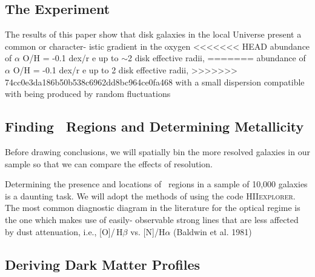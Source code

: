 \documentclass[11pt, a4paper, onecolumn]{article}
\begin{document}
\begin{multicols}{2}

\section{The Experiment}


    \citet{sanchez12} The results of this paper show that disk galaxies in the
    local Universe present a common or character- istic gradient in the oxygen
<<<<<<< HEAD
    abundance of $\alpha$ O/H = -0.1 dex/r e up to $\sim$2 disk effective radii,
=======
    abundance of $\alpha$ O/H = -0.1 dex/r e up to 2 disk effective radii,
>>>>>>> 74cc0e3da186b50b538c6962dd8bc964ce0fa468
    with a small dispersion compatible with being produced by random
    fluctuations


\subsection{Finding \hii\ Regions and Determining Metallicity}

    Before drawing conclusions, we will spatially bin the more resolved
    galaxies in our sample so that we can compare the effects of resolution.

    Determining the presence and locations of \hii\ regions in a sample of
    10,000 galaxies is a daunting task. We will adopt the methods of
    \citet{sanchez12} using the code \textsc{HIIexplorer}. The most common
    diagnostic diagram in the literature for the optical regime is the one
    which makes use of easily- observable strong lines that are less affected
    by dust attenuation, i.e., [O\iii]/\,H$\beta$ vs. [N\ii]/H$\alpha$
    (Baldwin et al. 1981)

\subsection{Deriving Dark Matter Profiles}




\end{multicols}
\end{document}
